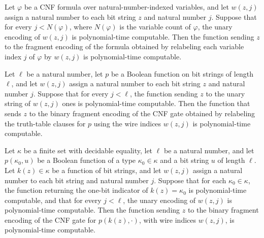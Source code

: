 \begin{theorem}
\label{Complexity.FormulaKit.polyTimeComputable_fragment_relabel}
\leanok
{}
Let $\varphi$ be a CNF formula over natural-number-indexed variables, and let $w(z,j)$
assign a natural number to each bit string $z$ and natural number $j$. Suppose that for
every $j<N(\varphi)$, where $N(\varphi)$ is the variable count of $\varphi$, the unary
encoding of $w(z,j)$ is polynomial-time computable. Then the function sending $z$ to the
fragment encoding of the formula obtained by relabeling each variable index $j$ of
$\varphi$ by $w(z,j)$ is polynomial-time computable.
\end{theorem}

\begin{theorem}
\label{Complexity.FormulaKit.polyTimeComputable_fragment_gate}
\leanok
{}
Let $\ell$ be a natural number, let $p$ be a Boolean function on bit strings of length
$\ell$, and let $w(z,j)$ assign a natural number to each bit string $z$ and natural
number $j$. Suppose that for every $j<\ell$, the function sending $z$ to the unary
string of $w(z,j)$ ones is polynomial-time computable. Then the function that sends $z$
to the binary fragment encoding of the CNF gate obtained by relabeling the truth-table
clauses for $p$ using the wire indices $w(z,j)$ is polynomial-time computable.
\end{theorem}

\begin{theorem}
\label{Complexity.FormulaKit.polyTimeComputable_fragment_gate_select}
\leanok
{}
Let $\kappa$ be a finite set with decidable equality, let $\ell$ be a natural number,
and let $p(\kappa_0,u)$ be a Boolean function of a type $\kappa_0\in\kappa$ and a bit
string $u$ of length $\ell$. Let $k(z)\in\kappa$ be a function of bit strings, and let
$w(z,j)$ assign a natural number to each bit string and natural number $j$. Suppose that
for each $\kappa_0\in\kappa$, the function returning the one-bit indicator of
$k(z)=\kappa_0$ is polynomial-time computable, and that for every $j<\ell$, the unary
encoding of $w(z,j)$ is polynomial-time computable. Then the function sending $z$ to the
binary fragment encoding of the CNF gate for $p(k(z),\cdot)$, with wire indices
$w(z,j)$, is polynomial-time computable.
\end{theorem}

